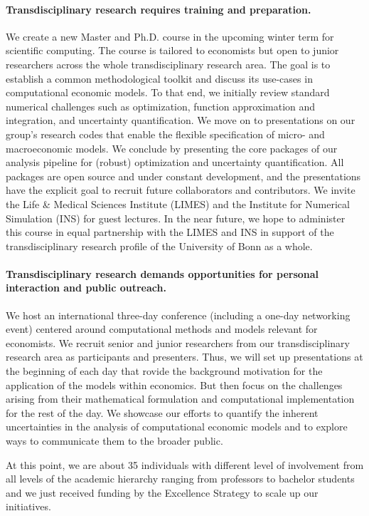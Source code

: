 \paragraph{Transdisciplinary research requires training and preparation.} We create a new Master and Ph.D. course in the upcoming winter term for scientific computing. The course is tailored to economists but open to junior researchers across the whole transdisciplinary research area. The goal is to establish a common methodological toolkit and discuss its use-cases in computational economic models. To that end, we initially review standard numerical challenges such as optimization, function approximation and integration, and uncertainty quantification. We move on to presentations on our group’s research codes that enable the flexible specification of micro- and macroeconomic models. We conclude by presenting the core packages of our analysis pipeline for (robust) optimization and uncertainty quantification. All packages are open source and under constant development, and the presentations have the explicit goal to recruit future collaborators and contributors. We invite the Life & Medical Sciences Institute (LIMES) and the Institute for Numerical Simulation (INS) for guest lectures. In the near future, we hope to administer this course in equal partnership with the LIMES and INS in support of the transdisciplinary research profile of the University of Bonn as a whole.

\paragraph{Transdisciplinary research demands opportunities for personal interaction and public outreach.} We host an international three-day conference (including a one-day networking event) centered around computational methods and models relevant for economists. We recruit senior and junior researchers from our transdisciplinary research area as participants and presenters. Thus, we will set up presentations at the beginning of each day that rovide the background motivation for the application of the models within economics. But then focus on the challenges arising from their mathematical formulation and computational implementation for the rest of the day. We showcase our efforts to quantify the inherent uncertainties in the analysis of computational economic models and to explore ways to communicate them to the broader public.

\noindent At this point, we are about 35 individuals with different level of involvement from all levels of the academic hierarchy ranging from professors to bachelor students and we just received funding by the Excellence Strategy to scale up our initiatives.\\
